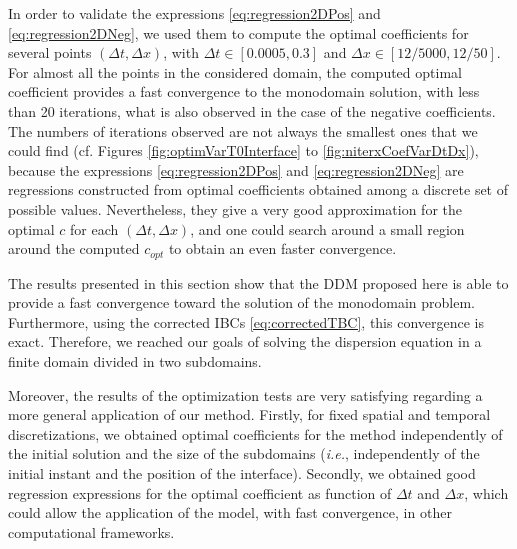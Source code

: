 \indent In order to validate the expressions \eqref{eq:regression2DPos} and \eqref{eq:regression2DNeg}, we used them to compute the optimal coefficients for several points $(\Delta t, \Delta x)$, with $\Delta t \in [0.0005,0.3]$ and $\Delta x \in \left[ 12/5000,12/50\right]$. For almost all the points in the considered domain, the computed optimal coefficient provides a fast convergence to the monodomain solution, with less than 20 iterations, what is also observed in the case of the negative coefficients. The numbers of iterations observed are not always the smallest ones that we could find (cf. Figures \ref{fig:optimVarT0Interface} to \ref{fig:niterxCoefVarDtDx}), because the expressions \eqref{eq:regression2DPos} and \eqref{eq:regression2DNeg} are regressions constructed from optimal coefficients obtained among a discrete set of possible values. Nevertheless, they give a very good approximation for the optimal $c$ for each $(\Delta t, \Delta x)$, and one could search around a small region around the computed $c_{opt}$ to obtain an even faster convergence.

 
\indent The results presented in this section show that the DDM proposed here is able to provide a fast convergence toward the solution of the monodomain problem. Furthermore, using the corrected IBCs \eqref{eq:correctedTBC}, this convergence is exact. Therefore, we reached our goals of solving the dispersion equation in a finite domain divided in two subdomains.

\indent Moreover, the results of the optimization tests are very satisfying regarding a more general application of our method. Firstly, for fixed spatial and temporal discretizations, we obtained optimal coefficients for the method independently of the initial solution and the size of the subdomains (\emph{i.e.}, independently of the initial instant and the position of the interface). Secondly, we obtained good regression expressions for the optimal coefficient as function of $\Delta t$ and $\Delta x$, which could allow the application of the model, with fast convergence, in other computational frameworks.













